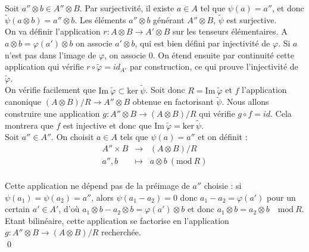 \begin{dem}
Soit $a''\otimes b \in A''\otimes B$. Par surjectivité, il existe $a\in A$ tel que $\psi(a)=a''$, et donc $\tilde\psi(a\otimes b ) = a''\otimes b$. Les éléments $a''\otimes b$ générant $A''\otimes B$, $\tilde \psi$ est surjective.\\

On va définir l'application $r : A\otimes B \rightarrow A' \otimes B$ sur les tenseurs élémentaires. A $a\otimes b= \varphi(a')\otimes b $ on associe $a'\otimes b$, qui est bien défini par injectivité de $\varphi$. Si $a$ n'est pas dans l'image de $\varphi$, on associe $0$. On étend ensuite par continuité cette application qui vérifie $r\circ \tilde\varphi = id_{A'}$ par construction, ce qui prouve l'injectivité de $\tilde\varphi$.\\

On vérifie facilement que $\text{Im} \ \tilde\varphi \subset \text{ker}\ \tilde \psi $. Soit donc $R=\text{Im} \ \tilde\varphi$ et $f$ l'application canonique $(A\otimes B)/ R \rightarrow A''\otimes B$ obtenue en factorisant $\tilde \psi$. Nous allons construire une application $g : A''\otimes B \rightarrow (A\otimes B)/ R $ qui vérifie $g\circ f = id $. Cela montrera que $f$ est injective et donc que $\text{Im} \ \tilde\varphi = \text{ker}\ \tilde \psi $.\\

Soit $a''\in A''$. On choisit $a\in A$ tels que $\psi(a)=a''$ et on définit : 
\[\begin{array}{rcl}
A''\times B & \rightarrow & (A\otimes B) /R \\
a'', b          & \mapsto     & a\otimes b \ (\text{mod} \ R)\\
\end{array}\] 

Cette application ne dépend pas de la préimage de $a''$ choisie : si $\psi(a_1)=\psi(a_2)=a''$, alors $\psi(a_1-a_2)=0$ donc $a_1-a_2=\varphi(a')$ pour un certain $a'\in A'$, d'où $a_1\otimes b -a_2\otimes b = \varphi(a')\otimes b$ et donc $a_1\otimes b = a_2\otimes b \quad \text{mod}\ R$.\\
Etant bilinéaire, cette application se factorise en l'application $g : A''\otimes B \rightarrow (A\otimes B) /R$ recherchée.\\

\qed
\end{dem}